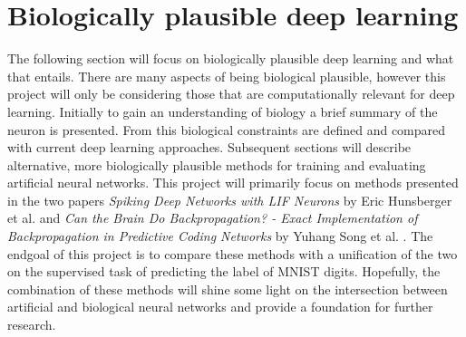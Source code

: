 \documentclass[a4paper,11pt]{article} %
\begin{document}
\section{Biologically plausible deep learning}

The following section will focus on biologically plausible deep learning and what that entails. There are many aspects of being biological plausible, however this project will only be considering those that are computationally relevant for deep learning. Initially to gain an understanding of biology a brief summary of the neuron is presented. From this biological constraints are defined and compared with current deep learning approaches. Subsequent sections will describe alternative, more biologically plausible methods for training and evaluating artificial neural networks. This project will primarily focus on methods presented in the two papers \textit{Spiking Deep Networks with LIF Neurons} by Eric Hunsberger et al. \cite{hunsberger2015spiking} and \textit{Can the Brain Do Backpropagation? - Exact Implementation of Backpropagation in Predictive Coding Networks} by Yuhang Song et al. \cite{PredictiveCodingNetworks}. The endgoal of this project is to compare these methods with a unification of the two on the supervised task of predicting the label of MNIST digits. Hopefully, the combination of these methods will shine some light on the intersection between artificial and biological neural networks and provide a foundation for further research.
\end{document}

